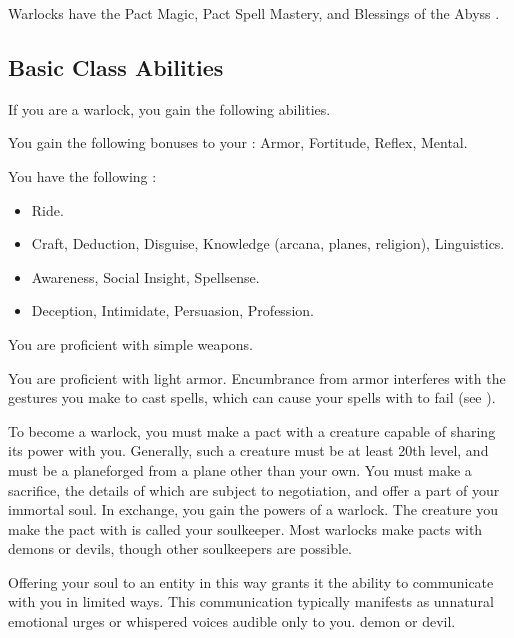      Warlocks have the Pact Magic, Pact Spell Mastery, and Blessings of the Abyss .

    \subsection{Basic Class Abilities}
        If you are a warlock, you gain the following abilities.

        You gain the following bonuses to your :  Armor,  Fortitude,  Reflex,  Mental.

        You have the following :
        \begin{itemize}
            \item {} Ride.
            \item {} Craft, Deduction, Disguise, Knowledge (arcana, planes, religion), Linguistics.
            \item {} Awareness, Social Insight, Spellsense.
            \item {} Deception, Intimidate, Persuasion, Profession.
        \end{itemize}

        You are proficient with simple weapons.

        You are proficient with light armor.
        Encumbrance from armor interferes with the gestures you make to cast spells, which can cause your spells with  to fail (see ).

        To become a warlock, you must make a pact with a creature capable of sharing its power with you.
        Generally, such a creature must be at least 20th level, and must be a planeforged from a plane other than your own.
        You must make a sacrifice, the details of which are subject to negotiation, and offer a part of your immortal soul.
        In exchange, you gain the powers of a warlock.
        The creature you make the pact with is called your soulkeeper.
        Most warlocks make pacts with demons or devils, though other soulkeepers are possible.

        Offering your soul to an entity in this way grants it the ability to communicate with you in limited ways.
        This communication typically manifests as unnatural emotional urges or whispered voices audible only to you.
        demon or devil.

